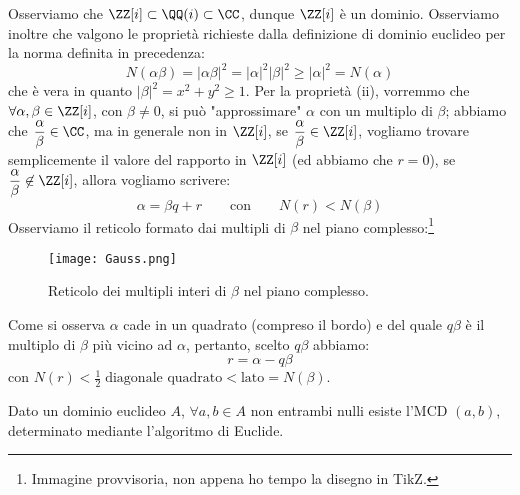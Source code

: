 \documentclass[11pt]{scrartcl}
\begin{document}
Osserviamo che $\ZZ[i] \subset \QQ(i) \subset \CC$, dunque $\ZZ[i]$ è un dominio. Osserviamo inoltre che valgono le proprietà richieste dalla definizione di dominio euclideo per la norma 
definita in precedenza:
\[ N(\alpha\beta) = |\alpha\beta|^2 = |\alpha|^2|\beta|^2 \geq |\alpha|^2 = N(\alpha)
    \]
che è vera in quanto $|\beta|^2 = x^2+y^2 \geq 1$. Per la proprietà (ii), vorremmo che $\forall \alpha,\beta \in \ZZ[i]$, con $\beta \ne 0$, si può "approssimare" $\alpha$ con un multiplo di $\beta$;
abbiamo che $\displaystyle \frac{\alpha}{\beta} \in \CC$, ma in generale non in $\ZZ[i]$, se $\displaystyle\frac{\alpha}{\beta} \in \ZZ[i]$, vogliamo trovare semplicemente il valore del rapporto in
$\ZZ[i]$ (ed abbiamo che $r = 0$), se $\displaystyle\frac{\alpha}{\beta} \not\in \ZZ[i]$, allora vogliamo scrivere:
\[ \alpha = \beta q + r \qquad \text{con}\qquad N(r) < N(\beta)
    \]
Osserviamo il reticolo formato dai multipli di $\beta$ nel piano complesso:\footnote{Immagine provvisoria, non appena ho tempo la disegno in TikZ.}

\begin{figure}[h]
    \centering
    \texttt{[image: Gauss.png]}
    \caption{Reticolo dei multipli interi di $\beta$ nel piano complesso.}
\end{figure}

Come si osserva $\alpha$ cade in un quadrato (compreso il bordo) e del quale $q\beta$ è il multiplo di $\beta$ più vicino ad $\alpha$, pertanto, scelto $q\beta$ abbiamo:
\[ r = \alpha - q\beta
    \]
con $\displaystyle N(r) < \frac{1}{2} \; \text{diagonale quadrato} < \text{lato} = N(\beta)$.

\begin{proposition}
    Dato un dominio euclideo $A$, $\forall a,b \in A$ non entrambi nulli esiste l'MCD $(a,b)$, determinato mediante l'algoritmo di Euclide.
\end{proposition}
\end{document}
